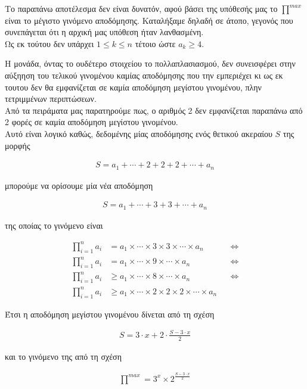 \documentclass[12pt]{article}
\newcommand{\centered}[1]{\begin{align*}#1\end{align*}}
\begin{document}
Το παραπάνω αποτέλεσμα δεν είναι δυνατόν, αφού βάσει της υπόθεσής μας το \( \stackrel{max}{\prod} \) είναι το μέγιστο γινόμενο αποδόμησης. Καταλήξαμε δηλαδή σε άτοπο, γεγονός που συνεπάγεται ότι η αρχική μας υπόθεση ήταν λανθασμένη. \\

Ως εκ τούτου δεν υπάρχει \( 1 \leq k \leq n \) τέτοιο ώστε \( a_k \geq 4 \). \\

\pagebreak

Η μονάδα, όντας το ουδέτερο στοιχείου το πολλαπλασιασμού, δεν συνεισφέρει στην αύξηηση του τελικού γινομένου καμίας αποδόμησης
που την εμπεριέχει κι ως εκ τουτου δεν θα εμφανίζεται σε καμία αποδόμηση μεγίστου γινομένου, πλην τετριμμένων περιπτώσεων. \\

Από τα πειράματα μας παρατηρούμε πως, ο αριθμός 2 δεν εμφανίζεται παραπάνω από 2 φορές σε καμία αποδόμηση μεγίστου γινομένου. \\

Αυτό είναι λογικό καθώς, δεδομένης μίας αποδόμησης ενός θετικού ακεραίου \( S \) της μορφής

\centered{S = a_1 + \dotsb + 2 + 2 + 2 + \dotsb + a_n}

μπορούμε να ορίσουμε μία νέα αποδόμηση

\centered{S = a_1 + \dotsb + 3 + 3 + \dotsb + a_n}

της οποίας το γινόμενο είναι

\begin{align*}
    \prod_{i = 1}^{n} a_i & = a_1 \times \dotsb \times 3 \times 3 \times \dotsb \times a_n && \Leftrightarrow \\
    \prod_{i = 1}^{n} a_i & = a_1 \times \dotsb \times 9 \times \dotsb \times a_n && \Leftrightarrow \\
    \prod_{i = 1}^{n} a_i & \geq a_1 \times \dotsb \times 8 \times \dotsb \times a_n && \Leftrightarrow \\
    \prod_{i = 1}^{n} a_i & \geq a_1 \times \dotsb \times 2 \times 2 \times 2 \times \dotsb \times a_n
\end{align*}

Έτσι η αποδόμηση μεγίστου γινομένου δίνεται από τη σχέση

\centered{S = 3 \cdot x + 2 \cdot \frac{S - 3 \cdot x}{2}}

και το γινόμενο της από τη σχέση

\centered{\stackrel{max}{\prod} = 3^x \times 2^{\frac{S - 3 \cdot x}{2}}}
\end{document}
